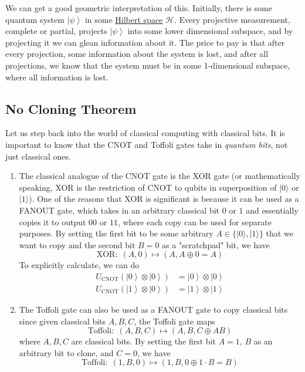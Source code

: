 \documentclass{article}
\newcommand{\ket}[1]{\ensuremath{\left|#1\right\rangle}}
\begin{document}
    We can get a good geometric interpretation of this. Initially, there is some quantum system $\ket{\psi}$ in some \hyperref[fa-def:hilbert-space]{Hilbert space} $\mathcal{H}$. Every projective measurement, complete or partial, projects $\ket{\psi}$ into some lower dimensional subspace, and by projecting it we can glean information about it. The price to pay is that after every projection, some information about the system is lost, and after all projections, we know that the system must be in some 1-dimensional subspace, where all information is lost.  

  \subsection{No Cloning Theorem} 

    Let us step back into the world of classical computing with classical bits. It is important to know that the CNOT and Toffoli gates take in \textit{quantum bits}, not just classical ones.

    \begin{enumerate}
      \item The classical analogue of the CNOT gate is the XOR gate (or mathematically speaking, XOR is the restriction of CNOT to qubits in superposition of $|0\rangle$ or $|1\rangle$). One of the reasons that XOR is significant is because it can be used as a FANOUT gate, which takes in an arbitrary classical bit $0$ or $1$ and essentially copies it to output $00$ or $11$, where each copy can be used for separate purposes. By setting the first bit to be some arbitrary $A \in \{|0\rangle, |1\rangle\}$ that we want to copy and the second bit $B = 0$ as a "scratchpad" bit, we have 
      \begin{equation} 
        \text{XOR}: \; (A, 0) \mapsto (A, A \oplus 0 = A)
      \end{equation}
      To explicitly calculate, we can do 
      \begin{align} 
        U_{\mathrm{CNOT}} (\ket{0} \otimes \ket{0}) & = \ket{0} \otimes \ket{0} \\
        U_{\mathrm{CNOT}} (\ket{1} \otimes \ket{0}) & = \ket{1} \otimes \ket{1}
      \end{align}

      \item The Toffoli gate can also be used as a FANOUT gate to copy classical bits since given classical bits $A, B, C$, the Toffoli gate maps 
      \begin{equation} 
        \text{Toffoli}: \; (A, B, C) \mapsto (A, B, C \oplus A B)
      \end{equation}
      where $A, B, C$ are classical bits. By setting the first bit $A = 1$, $B$ as an arbitrary bit to clone, and $C=0$, we have 
      \begin{equation} 
        \text{Toffoli}: \; (1, B, 0) \mapsto (1, B, 0 \oplus 1\cdot B = B)
      \end{equation}
    \end{enumerate}
\end{document}
